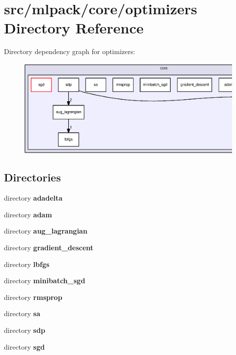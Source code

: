 \section{src/mlpack/core/optimizers Directory Reference}
\label{dir_c92267e6eea9957c44bb2efde721ca22}
Directory dependency graph for optimizers\+:
\nopagebreak
\begin{figure}[H]
\begin{center}
\leavevmode
\includegraphics[width=350pt]{dir_c92267e6eea9957c44bb2efde721ca22_dep}
\end{center}
\end{figure}
\subsection*{Directories}
\begin{DoxyCompactItemize}
\item 
directory {\bf adadelta}
\item 
directory {\bf adam}
\item 
directory {\bf aug\+\_\+lagrangian}
\item 
directory {\bf gradient\+\_\+descent}
\item 
directory {\bf lbfgs}
\item 
directory {\bf minibatch\+\_\+sgd}
\item 
directory {\bf rmsprop}
\item 
directory {\bf sa}
\item 
directory {\bf sdp}
\item 
directory {\bf sgd}
\end{DoxyCompactItemize}
